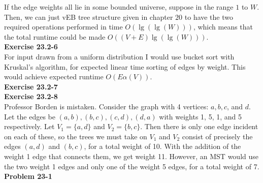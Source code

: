 \documentclass{article}
\begin{document}
If the edge weights all lie in some bounded universe, suppose in the range $1$ to $W$. Then, we can just vEB tree structure given in chapter $20$ to have the two required operations performed in time $O(\lg(\lg(W)))$, which means that the total runtime could be made $O((V+E)\lg(\lg(W)))$.\\

\noindent\textbf{Exercise 23.2-6}\\

For input drawn from a uniform distribution I would use bucket sort with Kruskal's algorithm, for expected linear time sorting of edges by weight.  This would achieve expected runtime $O(E\alpha(V))$. \\

\noindent\textbf{Exercise 23.2-7}\\

\noindent\textbf{Exercise 23.2-8}\\

Professor Borden is mistaken.  Consider the graph with 4 vertices: $a, b, c$, and $d$.  Let the edges be $(a,b), (b,c), (c,d), (d,a)$ with weights 1, 5, 1, and 5 respectively.  Let $V_1 = \{a,d\}$ and $V_2 = \{b,c\}$.  Then there is only one edge incident on each of these, so the trees we must take on $V_1$ and $V_2$ consist of precisely the edges $(a,d)$ and $(b,c)$, for a total weight of 10.  With the addition of the weight 1 edge that connects them, we get weight 11.  However, an MST would use the two weight 1 edges and only one of the weight 5 edges, for a total weight of 7. \\

\noindent\textbf{Problem 23-1}\\
\end{document}
